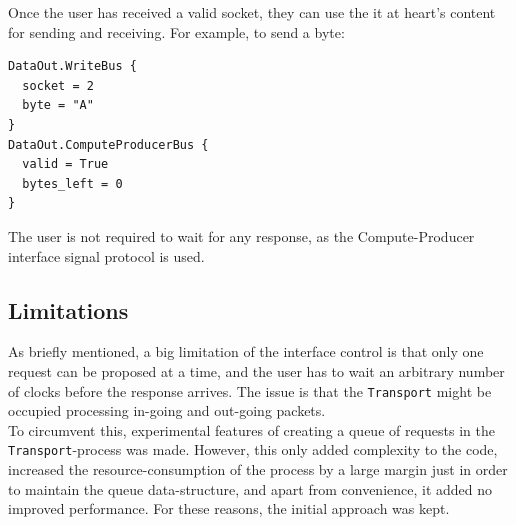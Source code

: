 Once the user has received a valid socket, they can use the it at heart's
content for sending and receiving. For example, to send a byte:
\begin{Verbatim}[frame=single,samepage=true]
DataOut.WriteBus {
  socket = 2
  byte = "A"
}
DataOut.ComputeProducerBus {
  valid = True
  bytes_left = 0
}
\end{Verbatim}
The user is not required to wait for any response, as the Compute-Producer
interface signal protocol is used.


\subsection{Limitations}
As briefly mentioned, a big limitation of the interface control is that only
one request can be proposed at a time, and the user has to wait an arbitrary
number of clocks before the response arrives. The issue is that the
\texttt{Transport} might be occupied processing in-going and out-going
packets.\\
To circumvent this, experimental features of creating a queue of requests in
the \texttt{Transport}-process was made. However, this only added complexity to
the code, increased the resource-consumption of the process by a large margin
just in order to maintain the queue data-structure, and apart from convenience,
it added no improved performance. For these reasons, the initial approach was
kept.













